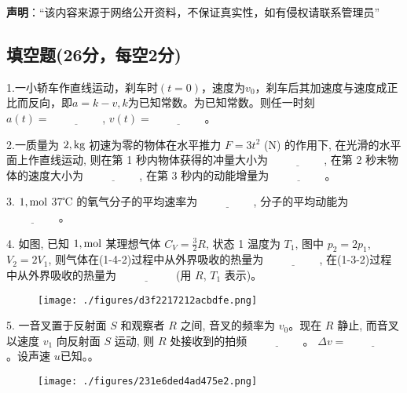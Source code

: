 
\textbf{声明}：“该内容来源于网络公开资料，不保证真实性，如有侵权请联系管理员”

\subsection{填空题(26分，每空2分)}
1.一小轿车作直线运动，刹车时$(t=0)$，速度为$v_0$，刹车后其加速度与速度成正比而反向，即$a=k-v,k$为已知常数。为已知常数。则任一时刻 $a(t) = \underline{\hspace{2cm}}$, $v(t) = \underline{\hspace{2cm}}$。

2.一质量为 $2 \\, \text{kg}$ 初速为零的物体在水平推力 $F = 3t^2$ (N) 的作用下, 在光滑的水平面上作直线运动, 则在第 1 秒内物体获得的冲量大小为 $\underline{\hspace{2cm}}$, 在第 2 秒末物体的速度大小为 $\underline{\hspace{2cm}}$, 在第 3 秒内的动能增量为 $\underline{\hspace{2cm}}$。

3. $1 \\, \text{mol}$ 37℃ 的氧气分子的平均速率为 $\underline{\hspace{2cm}}$, 分子的平均动能为 $\underline{\hspace{2cm}}$。

4. 如图, 已知 $1 \\, \text{mol}$ 某理想气体 $C_V = \frac{3}{2} R$, 状态 1 温度为 $T_1$, 图中 $p_2 = 2p_1$, $V_2 = 2V_1$, 则气体在(1-4-2)过程中从外界吸收的热量为  $\underline{\hspace{2cm}}$, 在(1-3-2)过程中从外界吸收的热量为  $\underline{\hspace{2cm}}$ (用 $R$, $T_1$ 表示)。
\begin{figure}[ht]
\centering
\texttt{[image: ./figures/d3f2217212acbdfe.png]}
\caption{} \label{fig_NJU07_1}
\end{figure}

5. 一音叉置于反射面 $S$ 和观察者 $R$ 之间, 音叉的频率为 $v_0$。现在 $R$ 静止, 而音叉以速度 $v_1$ 向反射面 $S$ 运动, 则 $R$ 处接收到的拍频 $\underline{\hspace{2cm}}$。 $\Delta v = \underline{\hspace{2cm}}$。设声速 $u$已知。。
\begin{figure}[ht]
\centering
\texttt{[image: ./figures/231e6ded4ad475e2.png]}
\caption{} \label{fig_NJU07_2}
\end{figure}

